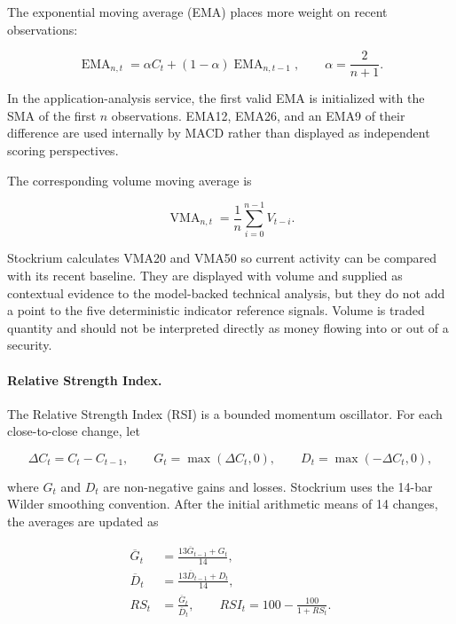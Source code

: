 The exponential moving average (EMA) places more weight on recent observations:

\begin{equation}
    \operatorname{EMA}_{n,t}
      =\alpha C_t+(1-\alpha)\operatorname{EMA}_{n,t-1},
    \qquad
    \alpha=\frac{2}{n+1}.
    \label{eq:technical-ema}
\end{equation}

In the application-analysis service, the first valid EMA is initialized with the SMA of the first $n$ observations. EMA12, EMA26, and an EMA9 of their difference are used internally by MACD rather than displayed as independent scoring perspectives.

The corresponding volume moving average is

\begin{equation}
    \operatorname{VMA}_{n,t}
      =\frac{1}{n}\sum_{i=0}^{n-1} V_{t-i}.
    \label{eq:technical-vma}
\end{equation}

Stockrium calculates VMA20 and VMA50 so current activity can be compared with its recent baseline. They are displayed with volume and supplied as contextual evidence to the model-backed technical analysis, but they do not add a point to the five deterministic indicator reference signals. Volume is traded quantity and should not be interpreted directly as money flowing into or out of a security.

\paragraph{Relative Strength Index.}

The Relative Strength Index (RSI) is a bounded momentum oscillator. For each close-to-close change, let

\begin{equation}
    \Delta C_t=C_t-C_{t-1}, \qquad
    G_t=\max(\Delta C_t,0), \qquad
    D_t=\max(-\Delta C_t,0),
\end{equation}

where $G_t$ and $D_t$ are non-negative gains and losses. Stockrium uses the 14-bar Wilder smoothing convention. After the initial arithmetic means of 14 changes, the averages are updated as

\begin{align}
    \overline{G}_t
      &=\frac{13\overline{G}_{t-1}+G_t}{14}, \\
    \overline{D}_t
      &=\frac{13\overline{D}_{t-1}+D_t}{14}, \\
    RS_t&=\frac{\overline{G}_t}{\overline{D}_t}, \qquad
    RSI_t=100-\frac{100}{1+RS_t}.
    \label{eq:technical-rsi}
\end{align}

